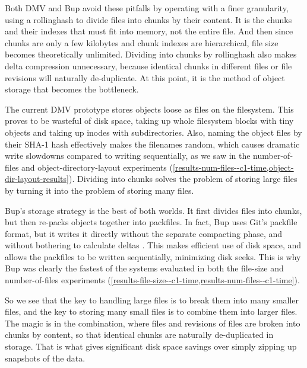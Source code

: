 Both \gls{DMV} and Bup avoid these pitfalls by operating with a finer
granularity, using a \gls{rollinghash} to divide files into chunks by their
content. It is the chunks and their indexes that must fit into memory, not the
entire file. And then since chunks are only a few kilobytes and chunk indexes
are hierarchical, file size becomes theoretically unlimited. Dividing into
chunks by \gls{rollinghash} also makes delta compression unnecessary, because
identical chunks in different files or file revisions will naturally
de-duplicate. At this point, it is the method of object storage that becomes the
bottleneck.

The current \gls{DMV} prototype stores objects loose as files on the filesystem.
This proves to be wasteful of disk space, taking up whole filesystem blocks with
tiny objects and taking up inodes with subdirectories. Also, naming the object
files by their SHA-1 hash effectively makes the filenames random, which causes
dramatic write slowdowns compared to writing sequentially, as we saw in the
number-of-files and object-directory-layout experiments
(\cref{results-num-files--c1-time,object-dir-layout-results}).
Dividing into chunks solves the problem of storing large files by turning it
into the problem of storing many files.

Bup's storage strategy is the best of both worlds. It first divides files into
chunks, but then re-packs objects together into \glspl{packfile}. In fact, Bup
uses Git's \gls{packfile} format\footnotemark, but it writes it directly without
the separate compacting phase, and without bothering to calculate deltas
\cite{bup_design}. This makes efficient use of disk space, and allows the
\glspl{packfile} to be written sequentially, minimizing disk seeks. This is why
Bup was clearly the fastest of the systems evaluated in both the file-size and
number-of-files experiments
(\cref{results-file-size--c1-time,results-num-files--c1-time}).


So we see that the key to handling large files is to break them into many
smaller files, and the key to storing many small files is to combine them into
larger files. The magic is in the combination, where files and revisions of
files are broken into chunks by content, so that identical chunks are naturally
de-duplicated in storage. That is what gives significant disk space savings over
simply zipping up snapshots of the data.


